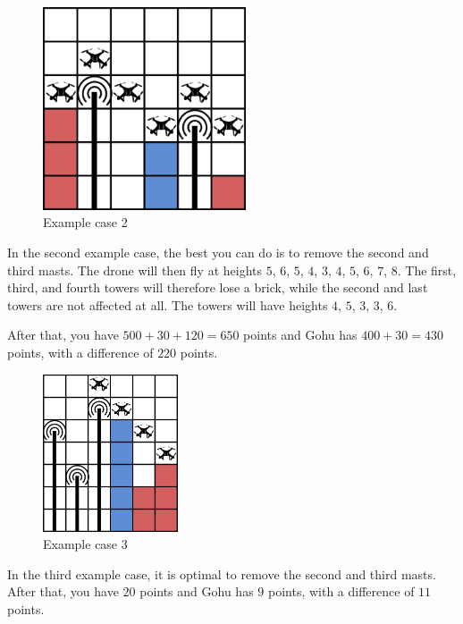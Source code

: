 \begin{figure}[!h]
  \centering
  \includegraphics[width=6cm]{sample1.png}
  \caption{Example case 2}
\end{figure}
In the second example case, the best you can do is to remove the second and third masts.
The drone will then fly at heights $5$, $6$, $5$, $4$, $3$, $4$, $5$, $6$, $7$, $8$.
The first, third, and fourth towers will therefore lose a brick, while the second and last towers are not affected at all.
The towers will have heights $4$, $5$, $3$, $3$, $6$.

After that, you have $500 + 30 + 120 = 650$ points and Gohu has $400 + 30 = 430$ points, with a difference of $220$ points.

\begin{figure}[!h]
  \centering
  \includegraphics[width=4cm]{sample3.png}
  \caption{Example case 3}
\end{figure}
In the third example case, it is optimal to remove the second and third masts.
After that, you have $20$ points and Gohu has $9$ points, with a difference of $11$ points.
